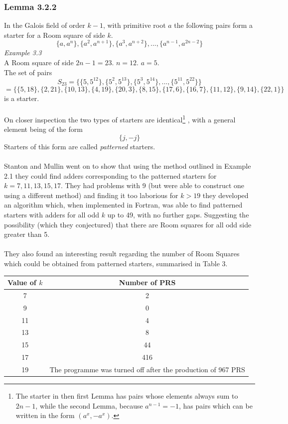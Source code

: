 \documentclass[
  12pt,
  a4paper]{book}
\begin{document}
\hypertarget{lemma-3.2.2}{%
\subsubsection{Lemma 3.2.2}\label{lemma-3.2.2}}

In the Galois field of order \(k-1\), with primitive root \(a\) the
following pairs form a starter for a Room square of side \(k\).
\[\{a,a^n\},\{a^2,a^{n+1}\},\{a^3,a^{n+2}\},...,\{a^{n-1},a^{2n-2}\}\]
\emph{Example 3.3}\\
A Room square of side \(2n-1=23\). \(n=12\). \(a=5\).\\
The set of pairs
\[S_{23}=\{\{5,5^{12}\},\{5^2,5^{13}\},\{5^3,5^{14}\},...,\{5^{11},5^{22}\}\}\]
\[=\{\{5,18\},\{2,21\},\{10,13\},\{4,19\},\{20,3\},\{8,15\},\{17,6\},\{16,7\},\{11,12\},\{9,14\},\{22,1\}\}\]
is a starter.\\
~\\
On closer inspection the two types of starters are identical\footnote{The
  starter in then first Lemma has pairs whose elements always sum to
  \(2n-1\), while the second Lemma, because \(a^{n-1}=-1\), has pairs
  which can be written in the form \((a^x,-a^x)\).} , with a general
element being of the form \[\{j,-j\}\] Starters of this form are called
\emph{patterned} starters.\\
~\\
Stanton and Mullin went on to show that using the method outlined in
Example 2.1 they could find adders corresponding to the patterned
starters for \(k=7,11,13,15,17\). They had problems with 9 (but were
able to construct one using a different method) and finding it too
laborious for \(k>19\) they developed an algorithm which, when
implemented in Fortran, was able to find patterned starters with adders
for all odd \(k\) up to 49, with no further gaps. Suggesting the
possibility (which they conjectured) that there are Room squares for all
odd side greater than 5.\\
~\\
They also found an interesting result regarding the number of Room
Squares which could be obtained from patterned starters, summarised in
Table 3.

\begin{longtable}[]{@{}cc@{}}
\toprule
Value of \(k\) & Number of PRS\tabularnewline
\midrule
\endhead
7 & 2\tabularnewline
9 & 0\tabularnewline
11 & 4\tabularnewline
13 & 8\tabularnewline
15 & 44\tabularnewline
17 & 416\tabularnewline
19 & The programme was turned off after the production of 967
PRS\tabularnewline
\bottomrule
\end{longtable}
\end{document}
